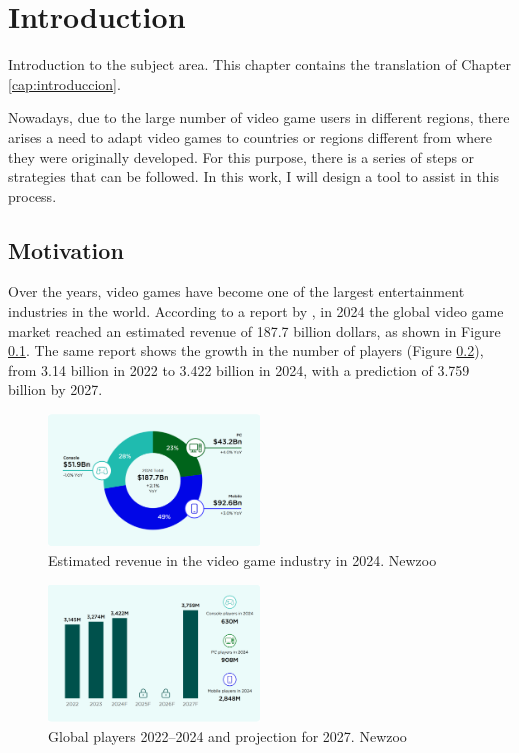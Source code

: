 \chapter*{Introduction}
\label{cap:introduction}

Introduction to the subject area. This chapter contains the translation of Chapter \ref{cap:introduccion}.

Nowadays, due to the large number of video game users in different regions, there arises a need to adapt video games to countries or regions different from where they were originally developed. For this purpose, there is a series of steps or strategies that can be followed. In this work, I will design a tool to assist in this process.

\section{Motivation}
Over the years, video games have become one of the largest entertainment industries in the world. According to a report by \cite{NZIngreso2024}, in 2024 the global video game market reached an estimated revenue of 187.7 billion dollars, as shown in Figure \ref{fig:NewZooRevenues_E}. The same report shows the growth in the number of players (Figure \ref{fig:NewzooPlayers_E}), from 3.14 billion in 2022 to 3.422 billion in 2024, with a prediction of 3.759 billion by 2027.

\begin{figure}[H]
	\centering
	\includegraphics[width = 0.5\textwidth]{Imagenes/Newzoo_2024_Revenues.png}
	\caption{Estimated revenue in the video game industry in 2024. Newzoo}
	\label{fig:NewZooRevenues_E}
\end{figure}

\begin{figure}[H]
	\centering
	\includegraphics[width = 0.5\textwidth]{Imagenes/Newzoo_Players.png}
	\caption{Global players 2022–2024 and projection for 2027. Newzoo}
	\label{fig:NewzooPlayers_E}
\end{figure}


